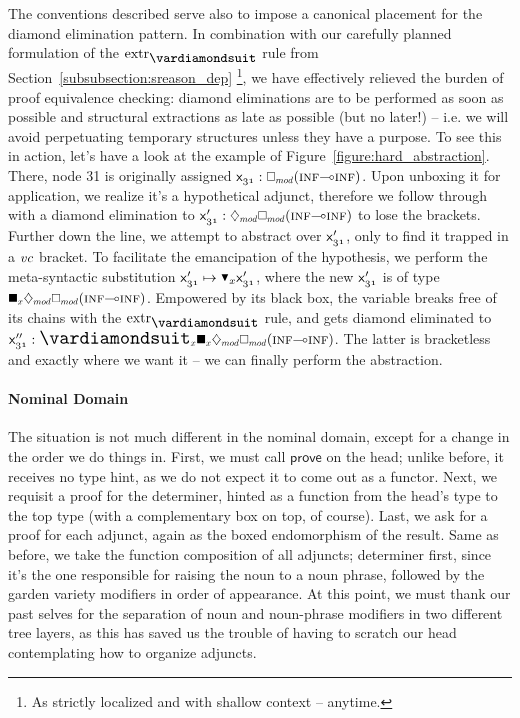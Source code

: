 The conventions described serve also to impose a canonical placement for the diamond elimination pattern.
In combination with our carefully planned formulation of the $\Extraction$ rule from Section~\ref{subsubsection:sreason_dep}%
	\footnote{As strictly localized and with shallow context -- anytime.},
we have effectively relieved the burden of proof equivalence checking: diamond eliminations are to be performed as soon as possible and structural extractions as late as possible (but no later!) -- i.e. we will avoid perpetuating temporary structures unless they have a purpose.
To see this in action, let's have a look at the example of Figure~\ref{figure:hard_abstraction}.
There, node 31 is originally assigned $\Var{31} : \dbox{mod}(\infp[s]\li\infp[s])$.
Upon unboxing it for application, we realize it's a hypothetical adjunct, therefore we follow through with a diamond elimination to $\Var{31}' : \ddia{mod}\dbox{mod}(\infp[s]\li\infp[s])$ to lose the  brackets.
Further down the line, we attempt to abstract over $\mathsf{x}_{\mathnormal{31}}'$, only to find it trapped in a $\mathnormal{vc}$ bracket.
To facilitate the emancipation of the hypothesis, we perform the meta-syntactic substitution $\Var{31}' \mapsto \dboxelim{x}\Var{31}'$, where the new $\mathsf{x}_{\mathnormal{31}}'$ is of type $\dxbox{x}\ddia{mod}\dbox{mod}(\infp[s]\li\infp[s])$.
Empowered by its black box, the variable breaks free of its chains with the $\Extraction$ rule, and gets diamond eliminated to $\Var{31}'' : \dxdia{x}\dxbox{x}\ddia{mod}\dbox{mod}(\infp[s]\li\infp[s])$.
The latter is bracketless and exactly where we want it -- we can finally perform the abstraction.

\paragraph{Nominal Domain}
The situation is not much different in the nominal domain, except for a change in the order we do things in.
First, we must call $\mathsf{prove}$ on the head; unlike before, it receives no type hint, as we do not expect it to come out as a functor.
Next, we requisit a proof for the determiner, hinted as a function from the head's type to the top type (with a complementary box on top, of course).
Last, we ask for a proof for each adjunct, again as the boxed endomorphism of the result.
Same as before, we take the function composition of all adjuncts; determiner first, since it's the one responsible for raising the noun to a noun phrase, followed by the garden variety modifiers in order of appearance.
At this point, we must thank our past selves for the separation of noun and noun-phrase modifiers in two different tree layers, as this has saved us the trouble of having to scratch our head contemplating how to organize adjuncts.

